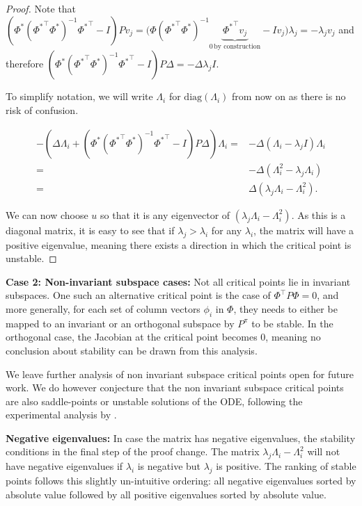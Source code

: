 \begin{proof}
Note that $\left(\Phi^*\left({\Phi^*}^\top {\Phi^*}\right)^{-1}{\Phi^*}^\top - I\right) P v_j = \Big(\Phi\left({\Phi^*}^\top {\Phi^*}\right)^{-1}\underbrace{{\Phi^*}^\top v_j}_{0\, \text{by construction}} - I v_j\Big) \lambda_j = -\lambda_j v_j$ and therefore $\left(\Phi^*\left({\Phi^*}^\top \Phi^*\right)^{-1}{\Phi^*}^\top - I\right) P \Delta = -\Delta \lambda_j I.$

To simplify notation, we will write $\Lambda_i$ for $\mathrm{diag}(\Lambda_i)$ from now on as there is no risk of confusion.

\begin{align*}
    -\left(\Delta \Lambda_i + \left(\Phi^*\left({\Phi^*}^\top \Phi^*\right)^{-1}{\Phi^*}^\top - I\right) P \Delta\right)\Lambda_i = &- \Delta \left(\Lambda_i - \lambda_j I\right) \Lambda_i\\
    = &-\Delta \left(\Lambda_i^2 - \lambda_j \Lambda_i\right) \\
    = &\Delta \left(\lambda_j \Lambda_i - \Lambda_i^2\right).
\end{align*}

We can now choose $u$ so that it is any eigenvector of $\left(\lambda_j \Lambda_i - \Lambda_i^2\right)$. As this is a diagonal matrix, it is easy to see that if $\lambda_j > \lambda_i$ for any $\lambda_i$, the matrix will have a positive eigenvalue, meaning there exists a direction in which the critical point is unstable.

\end{proof}


\textbf{Case 2: Non-invariant subspace cases:} Not all critical points lie in invariant subspaces.
One such an alternative critical point is the case of $\Phi^\top P \Phi = 0$, and more generally, for each set of column vectors $\phi_i$ in $\Phi$, they needs to either be mapped to an invariant or an orthogonal subspace by $P^\pi$ to be stable.
In the orthogonal case, the Jacobian at the critical point becomes 0, meaning no conclusion about stability can be drawn from this analysis.

We leave further analysis of non invariant subspace critical points open for future work.
We do however conjecture that the non invariant subspace critical points are also saddle-points or unstable solutions of the ODE, following the experimental analysis by \cite{tang2022understanding}.

\textbf{Negative eigenvalues:} In case the matrix has negative eigenvalues, the stability conditions in the final step of the proof change. The matrix $\lambda_j\Lambda_i - \Lambda_i^2$ will not have negative eigenvalues if $\lambda_i$ is negative but $\lambda_j$ is positive. The ranking of stable points follows this slightly un-intuitive ordering: all negative eigenvalues sorted by absolute value followed by all positive eigenvalues sorted by absolute value.

